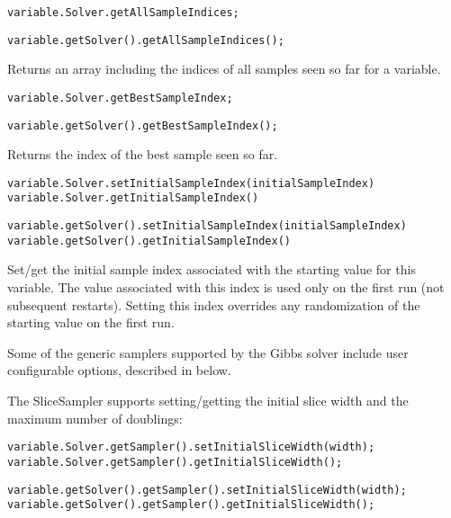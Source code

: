 \ifmatlab
\begin{lstlisting}
variable.Solver.getAllSampleIndices;
\end{lstlisting}
\fi

\ifjava
\begin{lstlisting}
variable.getSolver().getAllSampleIndices();
\end{lstlisting}
\fi

Returns an array including the indices of all samples seen so far for a variable.

\ifmatlab
\begin{lstlisting}
variable.Solver.getBestSampleIndex;
\end{lstlisting}
\fi

\ifjava
\begin{lstlisting}
variable.getSolver().getBestSampleIndex();
\end{lstlisting}
\fi

Returns the index of the best sample seen so far.


\ifmatlab
\begin{lstlisting}
variable.Solver.setInitialSampleIndex(initialSampleIndex)
variable.Solver.getInitialSampleIndex()
\end{lstlisting}
\fi

\ifjava
\begin{lstlisting}
variable.getSolver().setInitialSampleIndex(initialSampleIndex)
variable.getSolver().getInitialSampleIndex()
\end{lstlisting}
\fi

Set/get the initial sample index associated with the starting value for this variable.  The value associated with this index is used only on the first run (not subsequent restarts).  Setting this index overrides any randomization of the starting value on the first run.



Some of the generic samplers supported by the Gibbs solver include user configurable options, described in below.

The SliceSampler supports setting/getting the initial slice width and the maximum number of doublings:

\ifmatlab
\begin{lstlisting}
variable.Solver.getSampler().setInitialSliceWidth(width);
variable.Solver.getSampler().getInitialSliceWidth();
\end{lstlisting}
\fi

\ifjava
\begin{lstlisting}
variable.getSolver().getSampler().setInitialSliceWidth(width);
variable.getSolver().getSampler().getInitialSliceWidth();
\end{lstlisting}
\fi

